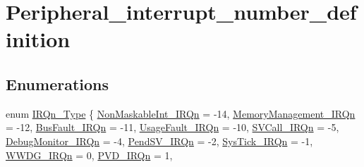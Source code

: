 \hypertarget{group___peripheral__interrupt__number__definition}{}\section{Peripheral\+\_\+interrupt\+\_\+number\+\_\+definition}
\label{group___peripheral__interrupt__number__definition}
\subsection*{Enumerations}
\begin{DoxyCompactItemize}
\item 
enum \hyperlink{group___peripheral__interrupt__number__definition_ga7e1129cd8a196f4284d41db3e82ad5c8}{I\+R\+Qn\+\_\+\+Type} \{ \newline
\hyperlink{group___peripheral__interrupt__number__definition_gga7e1129cd8a196f4284d41db3e82ad5c8ade177d9c70c89e084093024b932a4e30}{Non\+Maskable\+Int\+\_\+\+I\+R\+Qn} = -\/14, 
\hyperlink{group___peripheral__interrupt__number__definition_gga7e1129cd8a196f4284d41db3e82ad5c8a33ff1cf7098de65d61b6354fee6cd5aa}{Memory\+Management\+\_\+\+I\+R\+Qn} = -\/12, 
\hyperlink{group___peripheral__interrupt__number__definition_gga7e1129cd8a196f4284d41db3e82ad5c8a8693500eff174f16119e96234fee73af}{Bus\+Fault\+\_\+\+I\+R\+Qn} = -\/11, 
\hyperlink{group___peripheral__interrupt__number__definition_gga7e1129cd8a196f4284d41db3e82ad5c8a6895237c9443601ac832efa635dd8bbf}{Usage\+Fault\+\_\+\+I\+R\+Qn} = -\/10, 
\newline
\hyperlink{group___peripheral__interrupt__number__definition_gga7e1129cd8a196f4284d41db3e82ad5c8a4ce820b3cc6cf3a796b41aadc0cf1237}{S\+V\+Call\+\_\+\+I\+R\+Qn} = -\/5, 
\hyperlink{group___peripheral__interrupt__number__definition_gga7e1129cd8a196f4284d41db3e82ad5c8a8e033fcef7aed98a31c60a7de206722c}{Debug\+Monitor\+\_\+\+I\+R\+Qn} = -\/4, 
\hyperlink{group___peripheral__interrupt__number__definition_gga7e1129cd8a196f4284d41db3e82ad5c8a03c3cc89984928816d81793fc7bce4a2}{Pend\+S\+V\+\_\+\+I\+R\+Qn} = -\/2, 
\hyperlink{group___peripheral__interrupt__number__definition_gga7e1129cd8a196f4284d41db3e82ad5c8a6dbff8f8543325f3474cbae2446776e7}{Sys\+Tick\+\_\+\+I\+R\+Qn} = -\/1, 
\newline
\hyperlink{group___peripheral__interrupt__number__definition_gga7e1129cd8a196f4284d41db3e82ad5c8a971089d7566ef902dfa0c80ac3a8fd52}{W\+W\+D\+G\+\_\+\+I\+R\+Qn} = 0, 
\hyperlink{group___peripheral__interrupt__number__definition_gga7e1129cd8a196f4284d41db3e82ad5c8ab0b51ffcc4dcf5661141b79c8e5bd924}{P\+V\+D\+\_\+\+I\+R\+Qn} = 1, 

\end{DoxyCompactItemize}
